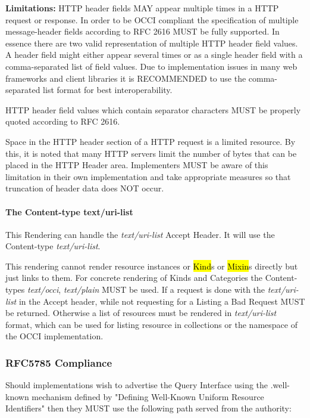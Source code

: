 \documentclass[10pt,a4paper]{article}
\begin{document}
\textbf{Limitations: } HTTP header fields MAY appear multiple times in
a HTTP request or response. In order to be OCCI compliant the
specification of multiple message-header fields according to RFC 2616
MUST be fully supported. In essence there are two valid representation
of multiple HTTP header field values. A header field might either
appear several times or as a single header field with a
comma-separated list of field values. Due to implementation issues in
many web frameworks and client libraries it is RECOMMENDED to use the
comma-separated list format for best interoperability.

HTTP header field values which contain separator characters MUST be
properly quoted according to RFC 2616.

Space in the HTTP header section of a HTTP request is a limited
resource. By this, it is noted that many HTTP servers limit the number
of bytes that can be placed in the HTTP Header area. Implementers MUST
be aware of this limitation in their own implementation and take
appropriate measures so that truncation of header data does NOT occur.

\paragraph{The Content-type text/uri-list}
This Rendering can handle the \textit{text/uri-list} Accept Header. It
will use the Content-type \textit{text/uri-list}.

This rendering cannot render resource instances or \hl{Kind}s or
\hl{Mixin}s directly but just links to them. For concrete rendering of
Kinds and Categories the Content-types \textit{text/occi},
\textit{text/plain} MUST be used. If a request is done with the
\textit{text/uri-list} in the Accept header, while not requesting for
a Listing a Bad Request MUST be returned. Otherwise a list of
resources must be rendered in \emph{text/uri-list} format, which can
be used for listing resource in collections or the namespace of the
OCCI implementation.

\subsubsection{RFC5785 Compliance}
\label{sec:rfc5785_compliance}
Should implementations wish to advertise the Query Interface using the
.well-known mechanism defined by "Defining Well-Known Uniform Resource
Identifiers" \cite{rfc5785} then they MUST use the following path
served from the authority:
\end{document}
